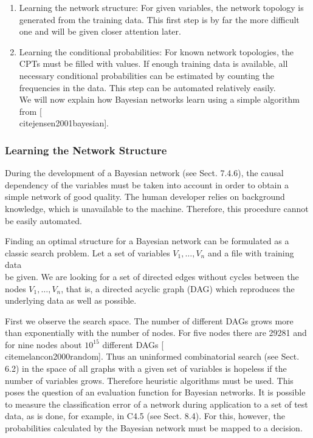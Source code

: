 \documentclass[10pt]{book}
\begin{document}
\begin{enumerate}
  \item Learning the network structure: For given variables, the network topology is generated from the training data. This first step is by far the more difficult one and will be given closer attention later.
  \item Learning the conditional probabilities: For known network topologies, the CPTs must be filled with values. If enough training data is available, all necessary conditional probabilities can be estimated by counting the frequencies in the data. This step can be automated relatively easily.\\[0pt]
We will now explain how Bayesian networks learn using a simple algorithm from [\\cite{jensen2001bayesian}].
\end{enumerate}

\subsubsection*{Learning the Network Structure}
During the development of a Bayesian network (see Sect. 7.4.6), the causal dependency of the variables must be taken into account in order to obtain a simple network of good quality. The human developer relies on background knowledge, which is unavailable to the machine. Therefore, this procedure cannot be easily automated.

Finding an optimal structure for a Bayesian network can be formulated as a classic search problem. Let a set of variables $V_{1}, \ldots, V_{n}$ and a file with training data\\
be given. We are looking for a set of directed edges without cycles between the nodes $V_{1}, \ldots, V_{n}$, that is, a directed acyclic graph (DAG) which reproduces the underlying data as well as possible.

First we observe the search space. The number of different DAGs grows more than exponentially with the number of nodes. For five nodes there are 29281 and for nine nodes about $10^{15}$ different DAGs [\\cite{melancon2000random}]. Thus an uninformed combinatorial search (see Sect. 6.2) in the space of all graphs with a given set of variables is hopeless if the number of variables grows. Therefore heuristic algorithms must be used. This poses the question of an evaluation function for Bayesian networks. It is possible to measure the classification error of a network during application to a set of test data, as is done, for example, in C4.5 (see Sect. 8.4). For this, however, the probabilities calculated by the Bayesian network must be mapped to a decision.
\end{document}

